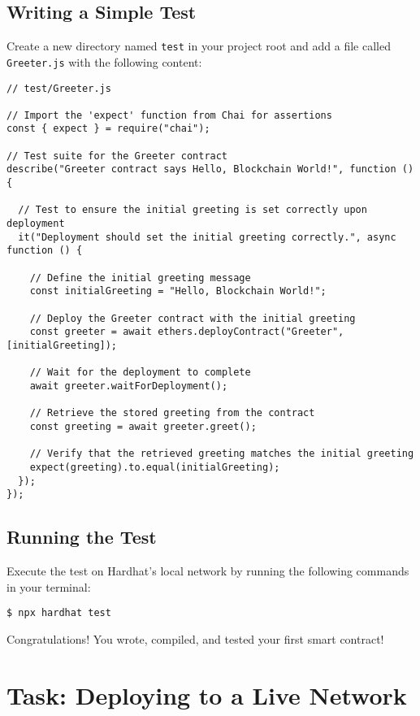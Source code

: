 \documentclass[12pt]{article}
\begin{document}
\subsection{Writing a Simple Test}

Create a new directory named \texttt{test} in your project root and add a file called \texttt{Greeter.js} with the following content:

\begin{verbatim}
// test/Greeter.js

// Import the 'expect' function from Chai for assertions
const { expect } = require("chai");

// Test suite for the Greeter contract
describe("Greeter contract says Hello, Blockchain World!", function () {
  
  // Test to ensure the initial greeting is set correctly upon deployment
  it("Deployment should set the initial greeting correctly.", async function () {
    
    // Define the initial greeting message
    const initialGreeting = "Hello, Blockchain World!";
    
    // Deploy the Greeter contract with the initial greeting
    const greeter = await ethers.deployContract("Greeter", [initialGreeting]);
    
    // Wait for the deployment to complete
    await greeter.waitForDeployment();

    // Retrieve the stored greeting from the contract
    const greeting = await greeter.greet();

    // Verify that the retrieved greeting matches the initial greeting
    expect(greeting).to.equal(initialGreeting);
  });
});
\end{verbatim}

\subsection{Running the Test}

Execute the test on Hardhat's local network by running the following commands in your terminal:

\begin{verbatim}
$ npx hardhat test
\end{verbatim}
Congratulations! You wrote, compiled, and tested your first smart contract!

\section{Task: Deploying to a Live Network}
\end{document}
